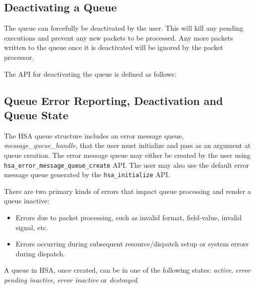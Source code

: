 

\hypertarget{coreapi_alter}{}\subsection{ Deactivating a Queue}
\label{queue_force_deactivate}
The queue can forcefully be deactivated by the user. This will kill
any pending executions and prevent any new packets to be processed.
Any more packets written to the queue once it is deactivated will be
ignored by the packet processor.

The API for deactivating the queue is defined as follows:



\hypertarget{queue_errors}{}\subsection{Queue Error Reporting,
Deactivation and Queue State} \label{queueerrors}
The HSA queue structure includes an error message queue, {\itshape
message\_queue\_handle}, that the user must initialize and pass as
an argument at queue creation. The error message queue may either be
created by the user using
\texttt{hsa\_error\_message\_queue\_create} API. The user may also
use the default error message queue generated by the
\texttt{hsa\_initialize} API.

There are two primary kinds of errors that impact queue
processing and render a queue inactive:
\begin{itemize}
        \item Errors due to packet processing, such as invalid
                format, field-value, invalid signal, etc.
        \item Errors occurring during subsequent resource/dispatch
                setup or system errors during dispatch.
\end{itemize}

A queue in HSA, once created, can be in one of the following states:
\emph{active}, \emph{error pending inactive}, \emph{error inactive}
or \emph{destroyed}.

